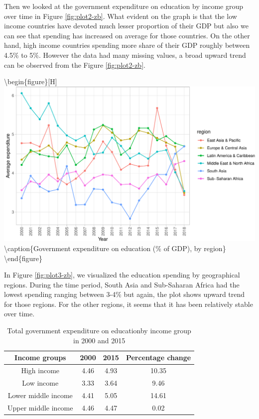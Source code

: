 \documentclass[11pt,a4paper,]{article}
\begin{document}
Then we looked at the government expenditure on education by income group over time in Figure \ref{fig:plot2-zb}. What evident on the graph is that the low income countries have devoted much lesser proportion of their GDP but also we can see that spending has increased on average for those countries. On the other hand, high income countries spending more share of their GDP roughly between 4.5\% to 5\%. However the data had many missing values, a broad upward trend can be observed from the Figure \ref{fig:plot2-zb}.

\textbackslash begin\{figure\}{[}H{]}
\includegraphics{report_files/figure-latex/plot3-zb-1} \textbackslash caption\{Government expenditure on education (\% of GDP), by region\}\label{fig:plot3-zb}
\textbackslash end\{figure\}

In Figure \ref{fig:plot3-zb}, we visualized the education spending by geographical regions. During the time period, South Asia and Sub-Saharan Africa had the lowest spending ranging between 3-4\% but again, the plot shows upward trend for those regions. For the other regions, it seems that it has been relatively stable over time.

\begin{table}[H]

\caption{\label{tab:plot4-zb}Total government expenditure on educationby income group in 2000 and 2015}
\centering
\begin{tabular}[t]{c|c|c|c}
\hline
Income groups & 2000 & 2015 & Percentage change\\
\hline
High income & 4.46 & 4.93 & 10.35\\
\hline
Low income & 3.33 & 3.64 & 9.46\\
\hline
Lower middle income & 4.41 & 5.05 & 14.61\\
\hline
Upper middle income & 4.46 & 4.47 & 0.02\\
\hline
\end{tabular}
\end{table}
\end{document}
